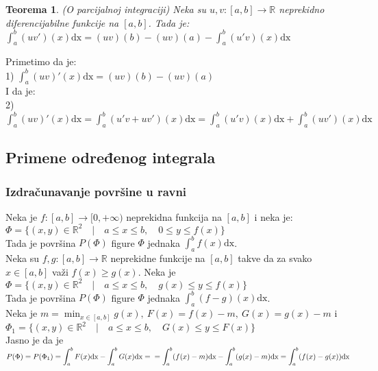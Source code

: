 \documentclass{article}
\newtheorem{teorema}{Teorema}[section]
\begin{document}
\begin{teoremabox}
    \begin{teorema}
        (O parcijalnoj integraciji) Neka su $u, v: [a, b] \rightarrow\mathbb{R}$ neprekidno diferencijabilne funkcije na $[a,b]$. Tada je:\\
        $\displaystyle\int^b_a(uv')(x)\text{dx} = (uv)(b) - (uv)(a) - \int^b_a(u'v)(x)\text{dx}$
    \end{teorema}
\end{teoremabox}
Primetimo da je:\\
1) $\displaystyle\int^b_a (uv)'(x)\text{dx} = (uv)(b) - (uv)(a)$\\
I da je:\\
2) $\displaystyle\int^b_a (uv)'(x)\text{dx} = \int^b_a(u'v + uv')(x)\text{dx} = \int^b_a(u'v)(x)\text{dx} + \int^b_a(uv')(x)\text{dx}$
\subsection{Primene određenog integrala}
\subsubsection{Izdračunavanje površine u ravni}
Neka je $f:[a, b] \rightarrow[0,+\infty)$ neprekidna funkcija na $[a,b]$ i neka je:\\
$\Phi = \{(x,y)\in\mathbb{R}^2\quad|\quad a\leq x\leq b,\quad 0\leq y\leq f(x)\}$\\
Tada je površina $P(\Phi)$ figure $\Phi$ jednaka $\displaystyle\int^b_a f(x)\text{dx}$.\\
Neka su $f,g:[a,b]\rightarrow\mathbb{R}$ neprekidne funkcije na $[a,b]$ takve da za svako $x\in[a,b]$ važi $f(x) \geq g(x)$. Neka je $\Phi = \{(x,y)\in\mathbb{R}^2\quad|\quad a\leq x\leq b,\quad g(x)\leq y\leq f(x)\}$\\
Tada je površina $P(\Phi)$ figure $\Phi$ jednaka $\displaystyle\int^b_a (f-g)(x)\text{dx}$.\\
Neka je $\displaystyle m = \min_{x\in[a,b]} g(x),\ F(x) = f(x) - m,\ G(x) = g(x) - m$ i\\
$\Phi_1 = \{(x,y)\in\mathbb{R}^2\quad|\quad a\leq x\leq b,\quad G(x)\leq y\leq F(x)\}$\\
Jasno je da je $P(\Phi) = P(\Phi_1) = \displaystyle\int^b_aF(x)\text{dx} - \int^b_aG(x)\text{dx} =\\= \int^b_a (f(x)-m)\text{dx}-\int^b_a(g(x)-m)\text{dx} = \int^b_a(f(x)-g(x))\text{dx}$\\
\end{document}
